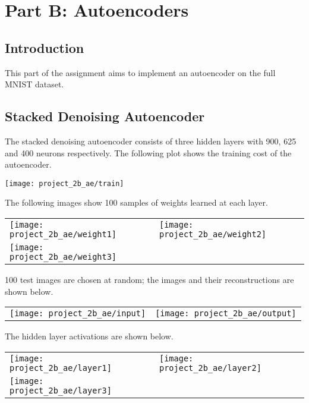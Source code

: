 \chapter*{Part B\@: Autoencoders}

\section*{Introduction}

This part of the assignment aims to implement an autoencoder on the full MNIST
dataset.

\section*{Stacked Denoising Autoencoder}

The stacked denoising autoencoder consists of three hidden layers with 900, 625
and 400 neurons respectively. The following plot shows the training cost of the
autoencoder.

\begin{center}
    \texttt{[image: project\_2b\_ae/train]}
\end{center}

The following images show 100 samples of weights learned at each layer.

\begin{longtabu}{X[c]X[c]}
    \texttt{[image: project\_2b\_ae/weight1]} &
    \texttt{[image: project\_2b\_ae/weight2]} \\
    \texttt{[image: project\_2b\_ae/weight3]}
\end{longtabu}

100 test images are chosen at random; the images and their reconstructions are
shown below.

\begin{longtabu}{X[c]X[c]}
    \texttt{[image: project\_2b\_ae/input]} &
    \texttt{[image: project\_2b\_ae/output]}
\end{longtabu}

The hidden layer activations are shown below.

\begin{longtabu}{X[c]X[c]}
    \texttt{[image: project\_2b\_ae/layer1]} &
    \texttt{[image: project\_2b\_ae/layer2]} \\
    \texttt{[image: project\_2b\_ae/layer3]}
\end{longtabu}

